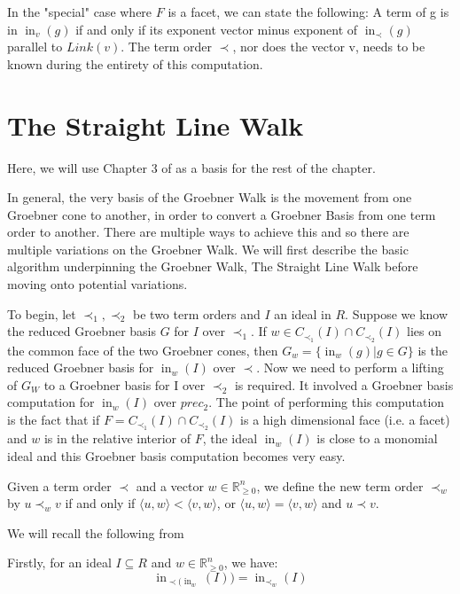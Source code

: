 \documentclass[12pt,a4paper]{report}
\DeclareMathOperator{\initial}{in}
\begin{document}
In the "special" case where $F$ is a facet, we can state the following: A term of g is in $\initial_{v} (g)$ if and only if its exponent vector minus exponent of $\initial_{\prec} (g)$ parallel to $Link(v)$. The term order $\prec$, nor does the vector v, needs to be known during the entirety of this computation.


\section{The Straight Line Walk}
Here, we will use Chapter 3 of \cite{GenericGroebner} as a basis for the rest of the chapter.

In general, the very basis of the Groebner Walk is the movement from one Groebner cone to another, in order to convert a Groebner Basis from one term order to another. There are multiple ways to achieve this and so there are multiple variations on the Groebner Walk. We will first describe the basic algorithm underpinning the Groebner Walk, The Straight Line Walk before moving onto potential variations. 

To begin, let $\prec_{1}, \prec_{2}$ be two term orders and $I$ an ideal in $R$. Suppose we know the reduced Groebner basis $G$ for $I$ over $\prec_{1}$. If $w \in C_{\prec_{1}} (I) \cap C_{\prec_{2}} (I)$ lies on the common face of the two Groebner cones, then $G_{w} = \{ \initial_{w} (g) \vert g \in G \}$ is the reduced Groebner basis for $\initial_{w} (I)$ over $\prec$. Now we need to perform a lifting of $G_{W}$ to a Groebner basis for I over $\prec_{2}$ is required. It involved a Groebner basis computation for $\initial_{w} (I)$ over $prec_{2}$. The point of performing this computation is the fact that if $F = C_{\prec_{1}} (I) \cap C_{\prec_{2}} (I)$ is a high dimensional face (i.e. a facet) and $w$ is in the relative interior of $F$, the ideal $\initial_{w} (I)$ is close to a monomial ideal and this Groebner basis computation becomes very easy.

Given a term order $\prec$ and a vector $w \in \mathbb{R}^{n} _{\geq 0}$, we define the new term order $\prec_{w}$ by $u \prec_{w} v$ if and only if $\langle u, w \rangle < \langle v, w \rangle$, or $\langle u, w \rangle = \langle v, w \rangle$ and $u \prec v$.

We will recall the following from \cite{GenericGroebner}

Firstly, for an ideal $I \subseteq R$ and $w \in \mathbb{R}_{\geq 0}^{n}$, we have:
\begin{equation*}
    \initial_{{\prec} ( \initial_{w}} (I)) = \initial_{{\prec}_{w}} (I)
\end{equation*}
\end{document}
